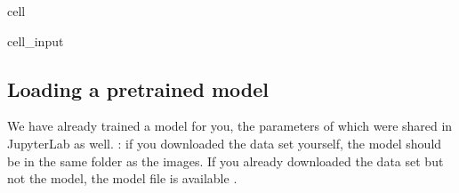 \documentclass[letterpaper,10pt,english]{jupyterBook}
\begin{document}
\begin{sphinxuseclass}{cell}
\begin{sphinxVerbatimInput}
\begin{sphinxuseclass}{cell_input}
\begin{sphinxVerbatim}[commandchars=\\\{\}]
        \PYG{p}{[} \PYG{p}{]} \PYG{p}{[} \PYG{p}{]} \PYG{p}{[}   \PYG{p}{]}        
    \PYG{p}{]}
  \PYG{p}{[}\PYG{p}{[}\PYG{p}{]}\PYG{p}{]} 
    
\end{sphinxVerbatim}

\end{sphinxuseclass}\end{sphinxVerbatimInput}

\end{sphinxuseclass}

\subsection{Loading a pretrained model}
\label{\detokenize{notebooks/Tutorial6_Registration/Tutorial6_Registration_student:loading-a-pretrained-model}}
\sphinxAtStartPar
We have already trained a model for you, the parameters of which were shared in JupyterLab as well.
: if you downloaded the data set yourself, the model should be in the same folder as the images.
If you already downloaded the data set but not the model, the model file is available .
\end{document}
